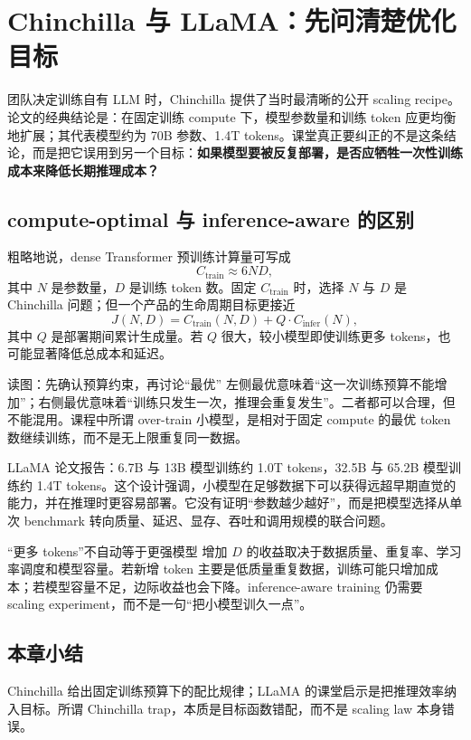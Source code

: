 \section{Chinchilla 与 LLaMA：先问清楚优化目标}

团队决定训练自有 LLM 时，Chinchilla 提供了当时最清晰的公开 scaling recipe。论文的经典结论是：在固定训练 compute 下，模型参数量和训练 token 应更均衡地扩展；其代表模型约为 70B 参数、1.4T tokens。课堂真正要纠正的不是这条结论，而是把它误用到另一个目标：\textbf{如果模型要被反复部署，是否应牺牲一次性训练成本来降低长期推理成本？}

\subsection{compute-optimal 与 inference-aware 的区别}

粗略地说，dense Transformer 预训练计算量可写成
\[
C_{\mathrm{train}}\approx 6ND,
\]
其中 $N$ 是参数量，$D$ 是训练 token 数。固定 $C_{\mathrm{train}}$ 时，选择 $N$ 与 $D$ 是 Chinchilla 问题；但一个产品的生命周期目标更接近
\[
J(N,D)=C_{\mathrm{train}}(N,D)
+Q\cdot C_{\mathrm{infer}}(N),
\]
其中 $Q$ 是部署期间累计生成量。若 $Q$ 很大，较小模型即使训练更多 tokens，也可能显著降低总成本和延迟。


\begin{knowledgebox}{读图：先确认预算约束，再讨论“最优”}
左侧最优意味着“这一次训练预算不能增加”；右侧最优意味着“训练只发生一次，推理会重复发生”。二者都可以合理，但不能混用。课程中所谓 over-train 小模型，是相对于固定 compute 的最优 token 数继续训练，而不是无上限重复同一数据。
\end{knowledgebox}

LLaMA 论文报告：6.7B 与 13B 模型训练约 1.0T tokens，32.5B 与 65.2B 模型训练约 1.4T tokens。这个设计强调，小模型在足够数据下可以获得远超早期直觉的能力，并在推理时更容易部署。它没有证明“参数越少越好”，而是把模型选择从单次 benchmark 转向质量、延迟、显存、吞吐和调用规模的联合问题。

\begin{warningbox}{“更多 tokens”不自动等于更强模型}
增加 $D$ 的收益取决于数据质量、重复率、学习率调度和模型容量。若新增 token 主要是低质量重复数据，训练可能只增加成本；若模型容量不足，边际收益也会下降。inference-aware training 仍需要 scaling experiment，而不是一句“把小模型训久一点”。
\end{warningbox}


\subsection{本章小结}

Chinchilla 给出固定训练预算下的配比规律；LLaMA 的课堂启示是把推理效率纳入目标。所谓 Chinchilla trap，本质是目标函数错配，而不是 scaling law 本身错误。

